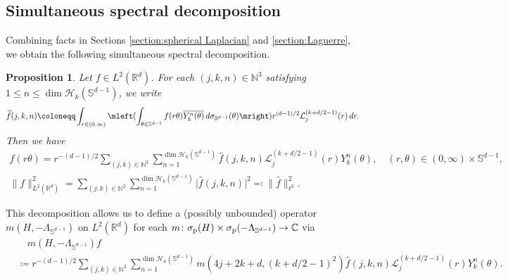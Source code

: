\documentclass[reqno]{amsart}
\theoremstyle{plain}
\newtheorem{proposition}[theorem]{Proposition}
\numberwithin{equation}{section}
\theoremstyle{remark}
\newcommand{\R}{\mathbb{R}}
\newcommand{\N}{\mathbb{N}}
\newcommand{\C}{\mathbb{C}}
\renewcommand{\S}{\mathbb{S}}
\newcommand{\intervaloo}[2]{(#1, #2)}
\newcommand{\sumn}{\sum_{n=1}^{\dim \HPk{k}(\S^{d-1})}}
\newcommand{\sumjkn}{\sum_{(j, k) \in \N^2} \!\!\!\! \sumn }
\newcommand{\abs}[1]{\lvert#1\rvert}
\newcommand{\norm}[1]{\lVert#1\rVert}
\newcommand{\conjugate}{\overline}
\newcommand{\Hamiltonian}{H}
\newcommand{\LambdaS}{\Lambda_{\S^{d-1}}}
\newcommand{\LaguerrecalLjnu}[2]{\mathcal{L}_{#1}^{(#2)}}
\newcommand{\Ykn}[2]{Y_{#1}^{#2}}
\newcommand{\HPk}[1]{ \mathcal{H}_{#1} }
\newcommand{\fjkn}[4]{\widehat{#1}(#2, #3, #4)}
\begin{document}
\subsection{Simultaneous spectral decomposition}
Combining facts in Sections \ref{section:spherical Laplacian} and \ref{section:Laguerre}, we obtain the following simultaneous spectral decomposition.
\begin{proposition} \label{prop:decomposition}
Let $f \in L^2(\R^d)$. For each $(j, k, n) \in \N^3$ satisfying $1 \leq n \leq \dim \HPk{k}(\S^{d-1})$, we write
\begin{equation}
\fjkn{f}{j}{k}{n} \coloneqq \int_{r \in \intervaloo{0}{\infty}} \mleft( \int_{\theta \in \S^{d-1}} f(r \theta) \conjugate{\Ykn{k}{n}(\theta)} \, d\sigma_{\S^{d-1}}(\theta) \mright) r^{(d-1)/2} \LaguerrecalLjnu{j}{k + d/2 - 1}(r) \, dr.
\end{equation}
Then we have
\begin{gather}
f(r \theta) = r^{-(d-1)/2} \sumjkn \fjkn{f}{j}{k}{n} \LaguerrecalLjnu{j}{k + d/2 - 1}(r) \Ykn{k}{n}(\theta) , \quad (r, \theta) \in \intervaloo{0}{\infty} \times \S^{d-1}, \\
\norm{f}_{L^2(\R^d)}^2 = \sumjkn \abs{\fjkn{f}{j}{k}{n}}^2 \eqcolon \norm{\widehat{f}}_{\ell^2}^2 .
\end{gather}
\end{proposition}
This decomposition allows us to define a (possibly unbounded) operator $m(\Hamiltonian, -\LambdaS)$ on $L^2(\R^d)$ for each $m \colon\sigma_{\textup{p}}(\Hamiltonian) \times \sigma_{\textup{p}}(-\LambdaS) \to \C$ via
\begin{align}
& \quad m(\Hamiltonian, -\LambdaS) f \\
&\coloneqq r^{-(d-1)/2} \sumjkn m(4j+2k+d, (k+d/2-1)^2) \fjkn{f}{j}{k}{n} \LaguerrecalLjnu{j}{k + d/2 - 1}(r) \Ykn{k}{n}(\theta) .
\end{align}
\end{document}
